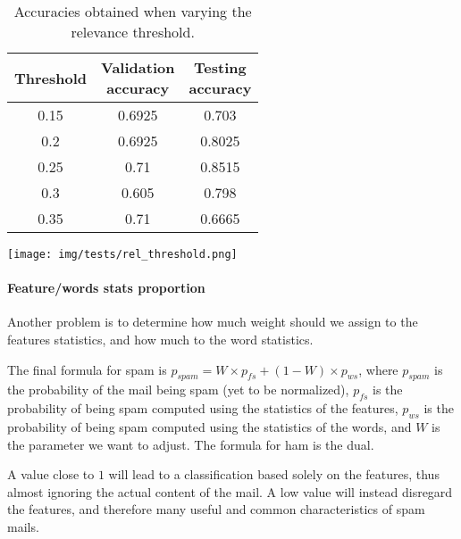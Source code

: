 \begin{center}
\begin{table}[h]
\begin{minipage}{.5\linewidth}
\begin{tabular}{ccc}
\toprule
Threshold & \shortstack{Validation\\ accuracy} & \shortstack{Testing\\ accuracy}\\
\midrule
0.15  & 0.6925 & 0.703  \\
0.2   & 0.6925 & 0.8025 \\
0.25  & 0.71 & 0.8515   \\
0.3   & 0.605 & 0.798   \\
0.35  & 0.71 & 0.6665   \\
\bottomrule
\end{tabular}
\end{minipage}
\begin{minipage}{.5\linewidth}
\texttt{[image: img/tests/rel\_threshold.png]}
    \label{fig:relthreshold}
\end{minipage}
\caption{Accuracies obtained when varying the relevance threshold.}
\end{table}
\label{tab:relevance}
\end{center}

\paragraph{Feature/words stats proportion}
Another problem is to determine how much weight should we assign to the features statistics, and how much to the word statistics.

The final formula for spam is $p_{spam} = W \times p_{fs} + (1-W) \times p_{ws}$, where $p_{spam}$ is the probability of the mail being spam (yet to be normalized), $p_{fs}$ is the probability of being spam computed using the statistics of the features, $p_{ws}$ is the probability of being spam computed using the statistics of the words, and $W$ is the parameter we want to adjust. The formula for ham is the dual.

A value close to $1$ will lead to a classification based solely on the features, thus almost ignoring the actual content of the mail. A low value will instead disregard the features, and therefore many useful and common characteristics of spam mails.

